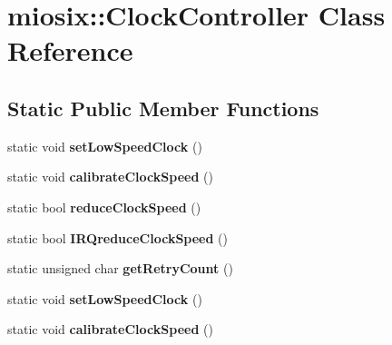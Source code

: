 \hypertarget{classmiosix_1_1_clock_controller}{\section{miosix\-:\-:Clock\-Controller Class Reference}
\label{classmiosix_1_1_clock_controller}
}
\subsection*{Static Public Member Functions}
\begin{DoxyCompactItemize}
\item 
\hypertarget{classmiosix_1_1_clock_controller_a1a014861a74eaf0e93d545f1f0dd2eb8}{static void {\bfseries set\-Low\-Speed\-Clock} ()}\label{classmiosix_1_1_clock_controller_a1a014861a74eaf0e93d545f1f0dd2eb8}

\item 
\hypertarget{classmiosix_1_1_clock_controller_ab04349c1fd72be5001c7e86f2fc8c1fe}{static void {\bfseries calibrate\-Clock\-Speed} ()}\label{classmiosix_1_1_clock_controller_ab04349c1fd72be5001c7e86f2fc8c1fe}

\item 
\hypertarget{classmiosix_1_1_clock_controller_a7d5fdadcf0a6227bb3528033987cefab}{static bool {\bfseries reduce\-Clock\-Speed} ()}\label{classmiosix_1_1_clock_controller_a7d5fdadcf0a6227bb3528033987cefab}

\item 
\hypertarget{classmiosix_1_1_clock_controller_a3e5fa07925dc4eced7ff54802a1c0b43}{static bool {\bfseries I\-R\-Qreduce\-Clock\-Speed} ()}\label{classmiosix_1_1_clock_controller_a3e5fa07925dc4eced7ff54802a1c0b43}

\item 
\hypertarget{classmiosix_1_1_clock_controller_a23e72801f95f7985eac2f0a176c73966}{static unsigned char {\bfseries get\-Retry\-Count} ()}\label{classmiosix_1_1_clock_controller_a23e72801f95f7985eac2f0a176c73966}

\item 
\hypertarget{classmiosix_1_1_clock_controller_a1a014861a74eaf0e93d545f1f0dd2eb8}{static void {\bfseries set\-Low\-Speed\-Clock} ()}\label{classmiosix_1_1_clock_controller_a1a014861a74eaf0e93d545f1f0dd2eb8}

\item 
\hypertarget{classmiosix_1_1_clock_controller_adcd906616759c7e73d94fa5d6c5b25f1}{static void {\bfseries calibrate\-Clock\-Speed} ()}\label{classmiosix_1_1_clock_controller_adcd906616759c7e73d94fa5d6c5b25f1}


\end{DoxyCompactItemize}

